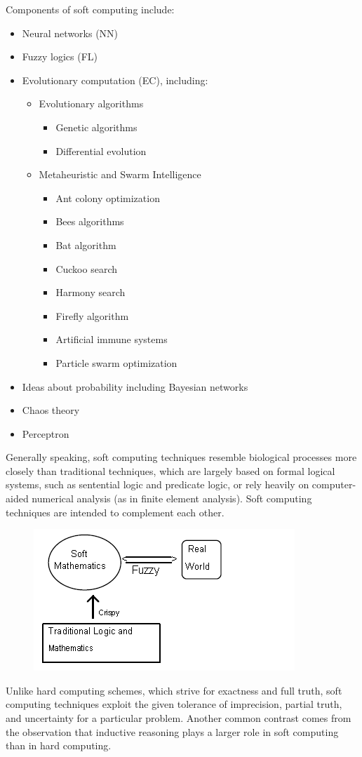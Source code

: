\documentclass[12pt]{article} %
\begin{document}
Components of soft computing include:
\begin{itemize}

\item{Neural networks (NN)}
\item{Fuzzy logics (FL)}
\item{Evolutionary computation (EC), including:}
\begin{itemize}
\item{Evolutionary algorithms}
\begin{itemize}
\item{Genetic algorithms}
\item{Differential evolution}
\end{itemize}
\item{Metaheuristic and Swarm Intelligence}
\begin{itemize}
\item{Ant colony optimization}
\item{Bees algorithms}
\item{Bat algorithm}
\item{Cuckoo search}
\item{Harmony search}
\item{Firefly algorithm}
\item{Artificial immune systems}
\item{Particle swarm optimization}
\end{itemize}
\end{itemize}
\item{Ideas about probability including Bayesian networks}
\item{Chaos theory}
\item{Perceptron}

\end{itemize}
Generally speaking, soft computing techniques resemble biological processes more closely than traditional techniques, which are largely based on formal logical systems, such as sentential logic and predicate logic, or rely heavily on computer-aided numerical analysis (as in finite element analysis). Soft computing techniques are intended to complement each other.
\begin{figure}[h]
  \centering
   \includegraphics[scale=1.0]{soft_computing.png}
\end{figure}
Unlike hard computing schemes, which strive for exactness and full truth, soft computing techniques exploit the given tolerance of imprecision, partial truth, and uncertainty for a particular problem. Another common contrast comes from the observation that inductive reasoning plays a larger role in soft computing than in hard computing.
\end{document}
